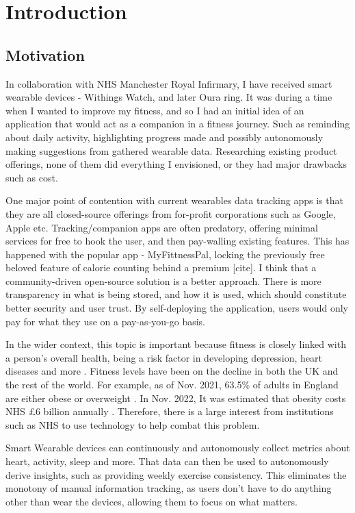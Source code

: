\chapter{Introduction}
\label{cha:intro}

\section{Motivation}
\par
In collaboration with NHS Manchester Royal Infirmary, I have received smart wearable devices - Withings Watch,
and later Oura ring. It was during a time when I wanted to improve my fitness, and so I had an initial idea of an
application that would act as a companion in a fitness journey. Such as reminding about daily activity, highlighting progress made and
possibly autonomously making suggestions from gathered wearable data. Researching existing product offerings, none of them 
did everything I envisioned, or they had major drawbacks such as cost.
\par One major point of contention with current wearables data tracking apps is that they are all closed-source offerings from for-profit corporations such as Google, Apple etc. Tracking/companion apps are often predatory, offering minimal services for free to hook the user, and then pay-walling existing features. This has happened with the popular app - MyFittnessPal, locking the previously free beloved feature of calorie counting behind a premium [cite]. I think that a community-driven open-source solution is a better approach. There is more transparency in what is being stored, and how it is used, which should constitute better security and user trust. By self-deploying the application, users would only pay for what they use on a pay-as-you-go basis. 
\par
In the wider context, this topic is important because fitness is closely linked with a person's overall health, being a risk factor in developing depression, heart diseases and more \cite{nhsObesity}. 
Fitness levels have been on the decline in both the UK and the rest of the world.
For example, as of Nov. 2021, 63.5\% of adults in England are either obese or overweight \cite{ukObesity2023Survey}. 
In Nov. 2022, It was estimated that obesity costs NHS £6 billion annually \cite{nhsObesityCost}.
Therefore, there is a large interest from institutions such as NHS to use technology to help combat this problem.

\par Smart Wearable devices can continuously and autonomously collect metrics about heart, activity, sleep and more. That data can then be used to autonomously derive insights, such as providing weekly exercise consistency. This eliminates the monotony of manual information tracking, as users don't have to do anything other than wear the devices, allowing them to focus on what matters. 

